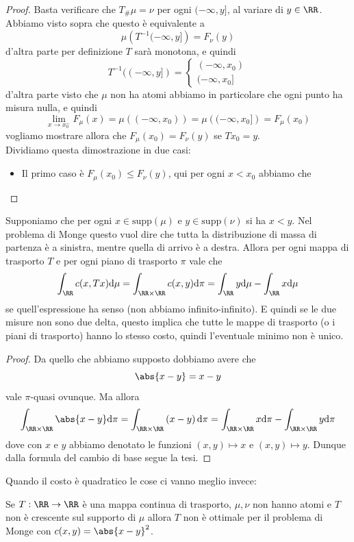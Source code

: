 \documentclass[11pt]{scrartcl}
\newcommand{\dif}{\text{d}}
\begin{document}
	\begin{proof}
		Basta verificare che $T_\#\mu=\nu$ per ogni $(-\infty,y]$, al variare di $y\in\RR$. Abbiamo visto sopra che questo è equivalente a 
		$$\mu\left(T^{-1}(-\infty,y]\right)=F_\nu(y)$$
		d'altra parte per definizione $T$ sarà monotona, e quindi 
		$$T^{-1}((-\infty,y])=\begin{cases}
			(-\infty,x_0) \\
			(-\infty,x_0]
		\end{cases}$$
		d'altra parte visto che $\mu$ non ha atomi abbiamo in particolare che ogni punto ha misura nulla, e quindi 
		$$\lim_{x\to x_0^-}F_\mu(x)=\mu((-\infty,x_0))=\mu\left((-\infty,x_0]\right)=F_\mu(x_0)$$
		vogliamo mostrare allora che $F_\mu(x_0)=F_\nu(y)$ se $Tx_0=y$. \\
		Dividiamo questa dimostrazione in due casi:
		\begin{itemize}
			\item Il primo caso è $F_\mu(x_0)\le F_\nu (y)$, qui per ogni $x<x_0$ abbiamo che
		\end{itemize}
	\end{proof}
	\begin{example}[Non unicità con $c(x,y)=\abs{x-y}$]
		Supponiamo che per ogni $x\in \text{supp}(\mu)$ e $y\in \text{supp}(\nu)$ si ha $x<y$. Nel problema di Monge questo vuol dire che tutta la distribuzione di massa di partenza è a sinistra, mentre quella di arrivo è a destra. Allora per ogni mappa di trasporto $T$ e per ogni piano di trasporto $\pi$ vale che
		$$\int_{\RR}c(x,Tx)\dif \mu=\int_{\RR\times\RR}c(x,y)\dif \pi=\int_{\RR}y\dif \mu-\int_{\RR}x\dif \mu$$
		se quell'espressione ha senso (non abbiamo infinito-infinito). E quindi se le due misure non sono due delta, questo implica che tutte le mappe di trasporto (o i piani di trasporto) hanno lo stesso costo, quindi l'eventuale minimo non è unico.
	\end{example}
	\begin{proof}
		Da quello che abbiamo supposto dobbiamo avere che 
		$$\abs{x-y}=x-y$$
		vale $\pi$-quasi ovunque. Ma allora 
		$$\int_{\RR\times \RR}\abs{x-y}\dif \pi=\int_{\RR\times\RR}\left(x-y\right)\dif \pi=\int_{\RR\times\RR}x\dif \pi-\int_{\RR\times \RR}y\dif \pi$$
		dove con $x$ e $y$ abbiamo denotato le funzioni $(x,y)\mapsto x$ e $(x,y)\mapsto y$. Dunque dalla formula del cambio di base segue la tesi.
	\end{proof}
	Quando il costo è quadratico le cose ci vanno meglio invece:
	\begin{lemma}
		Se $T:\RR\to\RR$ è una mappa continua di trasporto, $\mu,\nu$ non hanno atomi e $T$ non è crescente sul supporto di $\mu$ allora $T$ non è ottimale per il problema di Monge con $c(x,y)=\abs{x-y}^2$.
	\end{lemma}
\end{document}
